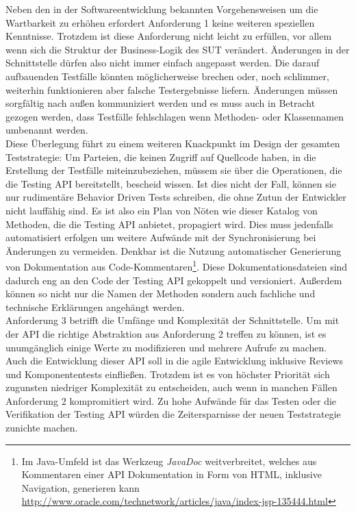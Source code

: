 Neben den in der Softwareentwicklung bekannten Vorgehensweisen um die  Wartbarkeit zu erhöhen erfordert Anforderung 1 keine weiteren speziellen Kenntnisse. Trotzdem ist diese Anforderung nicht leicht zu erfüllen, vor allem wenn sich die Struktur der Business-Logik des \Gls{SUT} verändert. Änderungen in der Schnittstelle dürfen also nicht immer einfach angepasst werden. Die darauf aufbauenden Testfälle könnten möglicherweise brechen oder, noch schlimmer, weiterhin funktionieren aber falsche Testergebnisse liefern. Änderungen müssen sorgfältig nach außen kommuniziert werden und es muss auch in Betracht gezogen werden, dass Testfälle fehlschlagen wenn Methoden- oder Klassennamen umbenannt werden.\\
Diese Überlegung führt zu einem weiteren Knackpunkt im Design der gesamten Teststrategie: Um Parteien, die keinen Zugriff auf Quellcode haben, in die Erstellung der Testfälle miteinzubeziehen, müssem sie über die Operationen, die die Testing API bereitstellt, bescheid wissen. Ist dies nicht der Fall, können sie nur rudimentäre Behavior Driven Tests schreiben, die ohne Zutun der Entwickler nicht lauffähig sind. Es ist also ein Plan von Nöten wie dieser Katalog von Methoden, die die Testing API anbietet, propagiert wird. Dies muss jedenfalls automatisiert erfolgen um weitere Aufwände mit der Synchronisierung bei Änderungen zu vermeiden. Denkbar ist die Nutzung automatischer Generierung von Dokumentation aus Code-Kommentaren\footnote{Im Java-Umfeld ist das Werkzeug \textit{JavaDoc} weitverbreitet, welches aus Kommentaren einer API Dokumentation in Form von HTML, inklusive Navigation, generieren kann \url{http://www.oracle.com/technetwork/articles/java/index-jsp-135444.html}}. Diese Dokumentationsdateien sind dadurch eng an den Code der Testing API gekoppelt und versioniert. Außerdem können so nicht nur die Namen der Methoden sondern auch fachliche und technische Erklärungen angehängt werden.\\
Anforderung 3 betrifft die Umfänge und Komplexität der Schnittstelle. Um mit der API die richtige Abstraktion aus Anforderung 2 treffen zu können, ist es unumgänglich einige Werte zu modifizieren und mehrere Aufrufe zu machen. Auch die Entwicklung dieser API soll in die agile Entwicklung inklusive \Glspl{Review} und Komponententests einfließen. Trotzdem ist es von höchster Priorität sich zugunsten niedriger Komplexität zu entscheiden, auch wenn in manchen Fällen Anforderung 2 kompromitiert wird. Zu hohe Aufwände für das Testen oder die Verifikation der Testing API würden die Zeitersparnisse der neuen Teststrategie zunichte machen.

